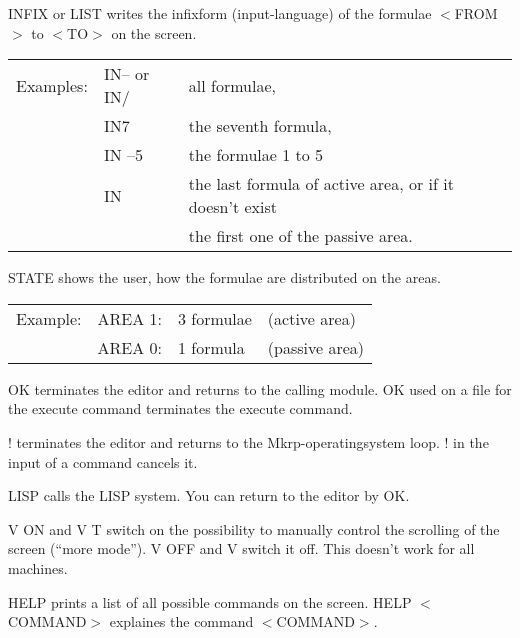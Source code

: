 %                
{ INFIX or LIST writes the infixform (input-language) of the formulae 
$<$FROM$>$ to $<$TO$>$ on the screen.

\begin{tabular}{lll}
Examples: &	IN-- or IN/  & all formulae,\\
&	IN7	&   the seventh formula, \\
&	IN --5	&   the formulae 1 to 5\\
&	IN	 &  the last formula of active area, or if it doesn't 
exist \\
&& the first one of the passive area. 
\end{tabular}}

%
{STATE shows the user, how the formulae are distributed on the areas. 

\begin{tabular}{llll}
Example:	& AREA 1: & 3   formulae   &   (active area) \\
&	AREA 0: & 1   formula     &   (passive area)
\end{tabular}}

%
{OK terminates the editor and returns to the calling module. 
OK used on a file for the execute command terminates the execute 
command. }

\index{!}\edc{!}%
{! terminates the editor and returns to the {\sc Mkrp}-operatingsystem loop. 
! in the input of a command cancels it.} 

%                
{LISP  calls the LISP system.
You can return to the editor by OK.}

%                
{V ON and V T switch on the possibility to manually control the scrolling of the screen (``more mode''). 
V OFF and V switch it off. This doesn't work for all machines.} 

%     
{HELP  prints a list of all possible commands on the screen. 
HELP $<$COMMAND$>$ explaines the command $<$COMMAND$>$.}

